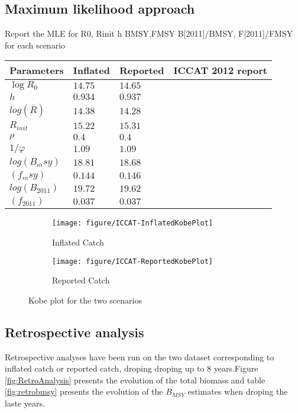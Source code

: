 
\subsection{Maximum likelihood approach}
Report the MLE for R0, Rinit h BMSY,FMSY B[2011]/BMSY, F[2011]/FMSY for each scenario
\begin{table}
 \begin{tabular}{p{2.1cm}p{4cm}p{4cm}p{4cm}}
  \hline
Parameters & Inflated & Reported & ICCAT 2012  report  \\ \hline
 $\log{R_0}$ &  $14.75$ &  $14.65$\\
 $h$  & $0.934$  & $0.937$\\
$log(\bar{R})$&  $14.38$  & $14.28$\\
$R_{init}$ &  $15.22$ & $15.31$\\
$\rho$ & $0.4$ &  $0.4$ & 	\\
$1/\varphi$  & $1.09$ &$1.09$ \\
$log(B_msy)$ &   $18.81$ &   $18.68$\\
$(f_msy)$   &$0.144$ & $0.146$\\
$log(B_{2011})$   &$19.72$   &$19.62$\\
$(f_{2011})$ &   $0.037$ &  $0.037$ \\
\end{tabular}
\end{table}



\begin{figure}
 \begin{subfigure}[b]{\textwidth}
  \texttt{[image: figure/ICCAT-InflatedKobePlot]} 
  \caption{Inflated Catch}
  \end{subfigure}
 \begin{subfigure}[b]{\textwidth}
  \texttt{[image: figure/ICCAT-ReportedKobePlot]} 
	\caption{Reported Catch}
  \end{subfigure}
\caption{Kobe plot for the two scenarios}
\end{figure}


\subsection{Retrospective analysis}
Retrospective analyses have been run on the two dataset corresponding to inflated catch or reported catch, droping 
 droping up to 8 years.Figure \ref{fig:RetroAnalysis}
 presents the evolution of the total biomass and table \ref{fig:retrobmsy} presents the evolution of the $B_{MSY}$ estimates when droping the laste years.
 


